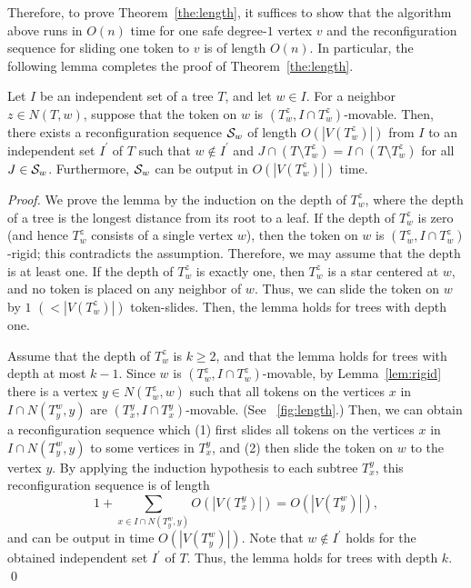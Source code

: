 \documentclass{llncs}
\newcommand{\msize}[1]{{\left|#1\right|}}
\newcommand{\Nei}[2]{N(#1,#2)}
\newcommand{\Tsub}[2]{T_{#1}^{#2}}
\newcommand{\bfI}{I}
\newcommand{\calS}{{\cal S}}
\newcommand{\bfIp}{\bfI^{\prime}}
\newcounter{one}
\begin{document}
	Therefore, to prove Theorem~\ref{the:length}, it suffices to show that the algorithm above runs in $O(n)$ time for one safe degree-$1$ vertex $v$ and the reconfiguration sequence for sliding one token to $v$ is of length $O(n)$. 
	In particular, the following lemma completes the proof of Theorem~\ref{the:length}. 
	\begin{lemma} \label{lem:moving_root}
	Let $\bfI$ be an independent set of a tree $T$, and let $w \in \bfI$. 
	For a neighbor $z \in \Nei{T}{w}$, suppose that the token on $w$ is $(\Tsub{w}{z}, \bfI \cap \Tsub{w}{z})$-movable. 
	Then, there exists a reconfiguration sequence $\calS_w$ of length $O(\msize{V(\Tsub{w}{z})})$ from $\bfI$ to an independent set $\bfIp$ of $T$ such that $w \not\in \bfIp$ and $J \cap (T \setminus \Tsub{w}{z}) = \bfI \cap (T \setminus \Tsub{w}{z})$ for all $J \in \calS_w$. 
	Furthermore, $\calS_w$ can be output in $O(\msize{V(\Tsub{w}{z})})$ time.
	\end{lemma}
	\begin{proof}
	We prove the lemma by the induction on the depth of $\Tsub{w}{z}$, where the depth of a tree is the longest distance from its root to a leaf.
	If the depth of $\Tsub{w}{z}$ is zero (and hence $\Tsub{w}{z}$ consists of a single vertex $w$), then the token on $w$ is $(\Tsub{w}{z}, \bfI \cap \Tsub{w}{z})$-rigid; 
this contradicts the assumption. 
	Therefore, we may assume that the depth is at least one.
	If the depth of $\Tsub{w}{z}$ is exactly one, then $\Tsub{w}{z}$ is a star centered at $w$, and no token is placed on any neighbor of $w$. 
	Thus, we can slide the token on $w$ by $1$ $(< \msize{V(\Tsub{w}{z})})$ token-slides.
	Then, the lemma holds for trees with depth one.

	Assume that the depth of $\Tsub{w}{z}$ is $k \ge 2$, and that the lemma holds for trees with depth at most $k-1$.
	Since $w$ is $(\Tsub{w}{z}, \bfI \cap \Tsub{w}{z})$-movable, by Lemma~\ref{lem:rigid} there is a vertex $y \in \Nei{\Tsub{w}{z}}{w}$ such that all tokens on the vertices $x$ in $\bfI \cap \Nei{\Tsub{y}{w}}{y}$ are $(\Tsub{x}{y}, \bfI \cap \Tsub{x}{y})$-movable. 
(See \figurename~\ref{fig:length}.)
	Then, we can obtain a reconfiguration sequence which (1) first slides all tokens on the vertices $x$ in $\bfI \cap \Nei{\Tsub{y}{w}}{y}$ to some vertices in $\Tsub{x}{y}$, and (2) then slide the token on $w$ to the vertex $y$.
	By applying the induction hypothesis to each subtree $\Tsub{x}{y}$, this reconfiguration sequence is of length 
	\[
		1 + \sum_{x \in \bfI \cap \Nei{\Tsub{y}{w}}{y}} O \left(\msize{V(\Tsub{x}{y})} \right) = O(\msize{V(\Tsub{y}{w})}),
	\]
and can be output in time $O(\msize{V(\Tsub{y}{w})})$. 
	Note that $w \not\in \bfIp$ holds for the obtained independent set $\bfIp$ of $T$.
	Thus, the lemma holds for trees with depth $k$. 
	\qed
	\end{proof}
\end{document}
